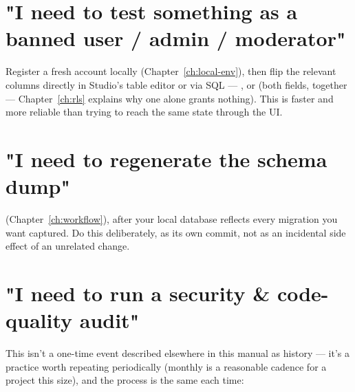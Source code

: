 \section{"I need to test something as a banned user / admin / moderator"}
Register a fresh account locally (Chapter~\ref{ch:local-env}), then flip the relevant  columns directly in Studio's table editor or via SQL — , or  (both fields, together — Chapter~\ref{ch:rls} explains why one alone grants nothing). This is faster and more reliable than trying to reach the same state through the UI.

\section{"I need to regenerate the schema dump"}
 (Chapter~\ref{ch:workflow}), after your local database reflects every migration you want captured. Do this deliberately, as its own commit, not as an incidental side effect of an unrelated change.

\section{"I need to run a security \& code-quality audit"}
This isn't a one-time event described elsewhere in this manual as history — it's a practice worth repeating periodically (monthly is a reasonable cadence for a project this size), and the process is the same each time:

